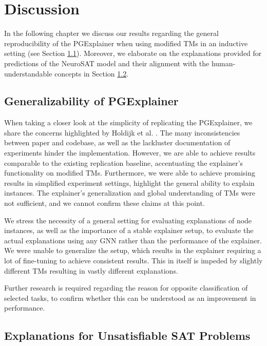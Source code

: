 \chapter{Discussion}

In the following chapter we discuss our results regarding the general reproducibility of the PGExplainer when using modified \acp{TM} in an inductive setting (see Section \ref{sec:discuss_pge}). Moreover, we elaborate on the explanations provided for predictions of the NeuroSAT model and their alignment with the human-understandable concepts in Section \ref{sec:discuss_sat}.


\section{Generalizability of PGExplainer}
\label{sec:discuss_pge}
When taking a closer look at the simplicity of replicating the PGExplainer, we share the concerns highlighted by Holdijk et al. \cite{holdijk2021re}. The many inconsistencies between paper and codebase, as well as the lackluster documentation of experiments hinder the implementation. However, we are able to achieve results comparable to the existing replication baseline, accentuating the explainer's functionality on modified \acp{TM}. Furthermore, we were able to achieve promising results in simplified experiment settings, highlight the general ability to explain instances. The explainer's generalization and global understanding of \acp{TM} were not sufficient, and we cannot confirm these claims at this point.

We stress the necessity of a general setting for evaluating explanations of node instances, as well as the importance of a stable explainer setup, to evaluate the actual explanations using any GNN rather than the performance of the explainer. We were unable to generalize the setup, which results in the explainer requiring a lot of fine-tuning to achieve consistent results. This in itself is impeded by slightly different \acp{TM} resulting in vastly different explanations.

Further research is required regarding the reason for opposite classification of selected tasks, to confirm whether this can be understood as an improvement in performance.

\section{Explanations for Unsatisfiable SAT Problems}
\label{sec:discuss_sat}

